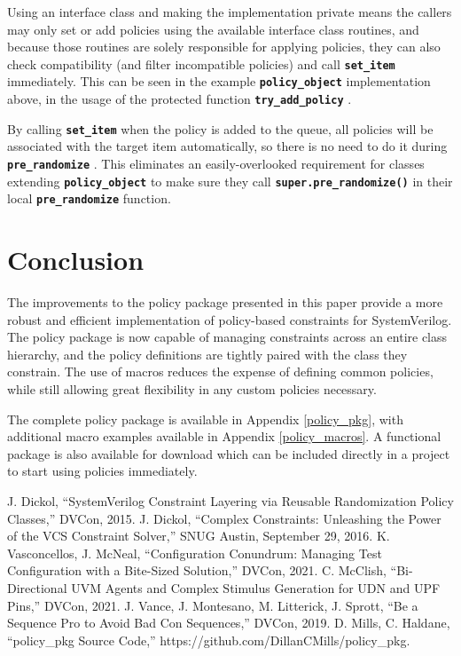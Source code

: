 \documentclass[conference,onecolumn]{IEEEtran}
\newcommand{\code}[1]{
\textbf{\texttt{#1}}
}
\begin{document}
Using an interface class and making the implementation private means the callers may only set or add policies using the available interface class routines, and because those routines are solely responsible for applying policies, they can also check compatibility (and filter incompatible policies) and call \code{set_item} immediately. This can be seen in the example \code{policy_object} implementation above, in the usage of the protected function \code{try_add_policy}.

By calling \code{set_item} when the policy is added to the queue, all policies will be associated with the target item automatically, so there is no need to do it during \code{pre_randomize}. This eliminates an easily-overlooked requirement for classes extending \code{policy_object} to make sure they call \code{super.pre_randomize()} in their local \code{pre_randomize} function.

\section{Conclusion}

The improvements to the policy package presented in this paper provide a more robust and efficient implementation of policy-based constraints for SystemVerilog. The policy package is now capable of managing constraints across an entire class hierarchy, and the policy definitions are tightly paired with the class they constrain. The use of macros reduces the expense of defining common policies, while still allowing great flexibility in any custom policies necessary.

The complete policy package is available in Appendix \ref{policy_pkg}, with additional macro examples available in Appendix \ref{policy_macros}. A functional package is also available for download \cite{b6} which can be included directly in a project to start using policies immediately.

\begin{thebibliography}{00}
     J. Dickol, ``SystemVerilog Constraint Layering via Reusable Randomization Policy Classes,'' DVCon, 2015.
     J. Dickol, ``Complex Constraints: Unleashing the Power of the VCS Constraint Solver,'' SNUG Austin, September 29, 2016.
     K. Vasconcellos, J. McNeal, ``Configuration Conundrum: Managing Test Configuration with a Bite-Sized Solution,'' DVCon, 2021.
     C. McClish, ``Bi-Directional UVM Agents and Complex Stimulus Generation for UDN and UPF Pins,'' DVCon, 2021.
     J. Vance, J. Montesano, M. Litterick, J. Sprott, ``Be a Sequence Pro to Avoid Bad Con Sequences,'' DVCon, 2019.
     D. Mills, C. Haldane, ``policy\_pkg Source Code,'' https://github.com/DillanCMills/policy\_pkg.
\end{thebibliography}
\end{document}
